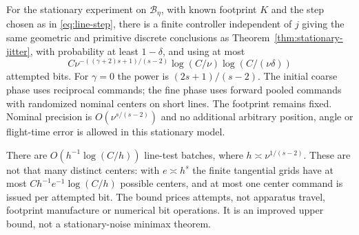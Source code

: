 \begin{theorem}
\label{thm:line-reconstruction}
For the stationary experiment on $\mathcal B_\eta$, with known
footprint $K$ and the step chosen as in \eqref{eq:line-step}, there is
a finite controller independent of $j$ giving the same geometric and
primitive discrete conclusions as Theorem~\ref{thm:stationary-jitter},
with probability at least $1-\delta$, and using at most
\begin{equation}\label{eq:line-total}
 C\nu^{-((\gamma+2)s+1)/(s-2)}
                   \log(C/\nu)\log(C/(\nu\delta))
\end{equation}
attempted bits. For $\gamma=0$ the power is $(2s+1)/(s-2)$.
The initial coarse phase uses reciprocal commands; the fine phase
uses forward pooled commands with randomized nominal centers on short
lines. The footprint remains fixed. Nominal precision is
$O(\nu^{s/(s-2)})$ and no additional arbitrary position, angle or
flight-time error is allowed in this stationary model.

There are $O(h^{-1}\log(C/h))$ line-test batches, where
$h\asymp\nu^{1/(s-2)}$. These are not that many distinct centers:
with $e\asymp h^s$ the finite tangential grids have at most
$C h^{-1}e^{-1}\log(C/h)$ possible centers, and at most one center
command is issued per attempted bit. The bound prices attempts,
not apparatus travel, footprint manufacture or numerical bit operations.
It is an improved upper bound, not a stationary-noise minimax theorem.
\end{theorem}
